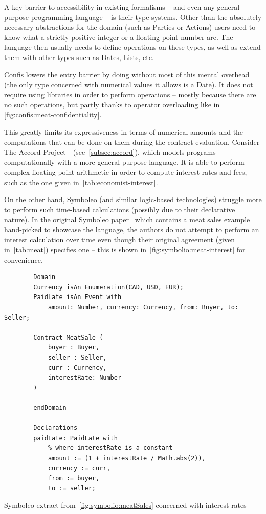 A key barrier to accessibility in existing formalisms -- and even any general-purpose programming language -- is their type systems.
Other than the absolutely necessary abstractions for the domain (such as Parties or Actions) users need to know what a strictly positive integer or a floating point number are.
The language then usually needs to define operations on these types, as well as extend them with other types such as Dates, Lists, etc.

Confis lowers the entry barrier by doing without most of this mental overhead (the only type concerned with numerical values it allows is a Date).
It does not require using libraries in order to perform operations -- mostly because there are no such operations, but partly thanks to operator overloading like in \autoref{fig:confis:meat-confidentiality}.

This greatly limits its expressiveness in terms of numerical amounts and the computations that can be done on them during the contract evaluation.
Consider The Accord Project~\cite{accordHomepage}~(see~\autoref{subsec:accord}), which models programs computationally with a more general-purpose language.
It is able to perform complex floating-point arithmetic in order to compute interest rates and fees, such as the one given in~\autoref{tab:economist-interest}.

On the other hand, Symboleo (and similar logic-based technologies) struggle more to perform such time-based calculations (possibly due to their declarative nature).
In the original Symboleo paper~\cite{symboleo2020} which contains a meat sales example hand-picked to showcase the language, the authors do not attempt to perform an interest calculation over time even though their original agreement (given in~\autoref{tab:meat}) specifies one -- this is shown in~\autoref{fig:symbolio:meat-interest} for convenience.

\begin{listing}[h]
    \centering
    \begin{minipage}{0.85\textwidth}
        \begin{verbatim}
        Domain
        Currency isAn Enumeration(CAD, USD, EUR);
        PaidLate isAn Event with
            amount: Number, currency: Currency, from: Buyer, to: Seller;

        Contract MeatSale (
            buyer : Buyer,
            seller : Seller,
            curr : Currency,
            interestRate: Number
        )

        endDomain

        Declarations
        paidLate: PaidLate with
            % where interestRate is a constant
            amount := (1 + interestRate / Math.abs(2)),
            currency := curr,
            from := buyer,
            to := seller;
        \end{verbatim}
    \end{minipage}
    \caption{Symboleo extract from~\autoref{fig:symbolio:meatSales} concerned with interest rates}
    \label{fig:symbolio:meat-interest}
\end{listing}

